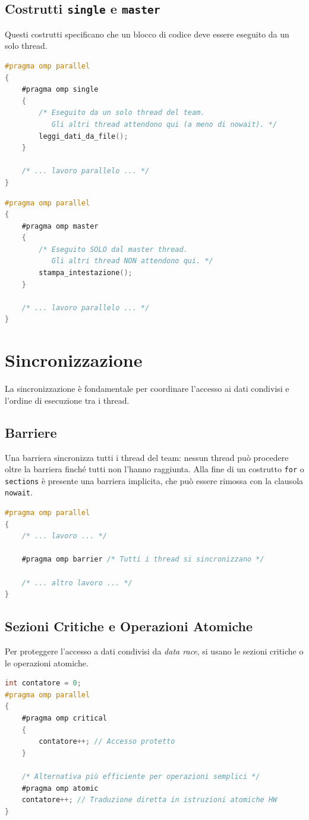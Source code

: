 \subsection{Costrutti \texttt{single} e \texttt{master}}
Questi costrutti specificano che un blocco di codice deve essere eseguito da un solo thread.
\begin{lstlisting}[language=C, numbers=none]
#pragma omp parallel
{
    #pragma omp single
    {
        /* Eseguito da un solo thread del team.
           Gli altri thread attendono qui (a meno di nowait). */
        leggi_dati_da_file();
    }

    /* ... lavoro parallelo ... */
}
\end{lstlisting}

\begin{lstlisting}[language=C, numbers=none]
#pragma omp parallel
{
    #pragma omp master
    {
        /* Eseguito SOLO dal master thread.
           Gli altri thread NON attendono qui. */
        stampa_intestazione();
    }

    /* ... lavoro parallelo ... */
}
\end{lstlisting}

\section{Sincronizzazione}
La sincronizzazione è fondamentale per coordinare l'accesso ai dati condivisi e l'ordine di esecuzione tra i thread.

\subsection{Barriere}
Una barriera sincronizza tutti i thread del team: nessun thread può procedere oltre la barriera finché tutti non l'hanno raggiunta. Alla fine di un costrutto \texttt{for} o \texttt{sections} è presente una barriera implicita, che può essere rimossa con la clausola \texttt{nowait}.
\begin{lstlisting}[language=C, numbers=none]
#pragma omp parallel
{
    /* ... lavoro ... */

    #pragma omp barrier /* Tutti i thread si sincronizzano */

    /* ... altro lavoro ... */
}
\end{lstlisting}

\subsection{Sezioni Critiche e Operazioni Atomiche}
Per proteggere l'accesso a dati condivisi da \emph{data race}, si usano le sezioni critiche o le operazioni atomiche.
\begin{lstlisting}[language=C, numbers=none]
int contatore = 0;
#pragma omp parallel
{
    #pragma omp critical
    {
        contatore++; // Accesso protetto
    }

    /* Alternativa più efficiente per operazioni semplici */
    #pragma omp atomic
    contatore++; // Traduzione diretta in istruzioni atomiche HW
}
\end{lstlisting}

